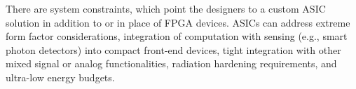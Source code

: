 There are system constraints, which point the designers to a custom ASIC solution in addition to or in place of FPGA devices. ASICs can address extreme form factor considerations, integration of computation with sensing (e.g., smart photon detectors) into compact front-end devices, tight integration with other mixed signal or analog functionalities, radiation hardening requirements, and ultra-low energy budgets.   
